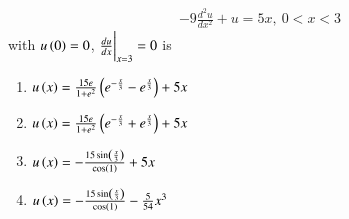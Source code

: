 \documentclass[journal]{IEEEtran}
\begin{document}
\begin{enumerate}
\begin{align*}
    -9\frac{d^2u}{dx^2} + u = 5x,\ 0 < x <3
\end{align*}
with $u\left(0\right) = 0$, $\frac{du}{dx}\bigg{|}_{x=3} = 0$ is
\begin{enumerate}
    \item $u\left(x\right) = \frac{15e}{1+e^2}\left(e^{-\frac{x}{3}} - e^{\frac{x}{3}}\right) + 5x$
    \item $u\left(x\right) = \frac{15e}{1+e^2}\left(e^{-\frac{x}{3}} + e^{\frac{x}{3}}\right) + 5x$
    \item $u\left(x\right) = -\frac{15\sin\left(\frac{x}{3}\right)}{\cos\left(1\right)} + 5x$
    \item $u\left(x\right) = -\frac{15\sin\left(\frac{x}{3}\right)}{\cos\left(1\right)} - \frac{5}{54}x^3$ \\
\end{enumerate}
			 \end{enumerate}
			 
\end{document}
